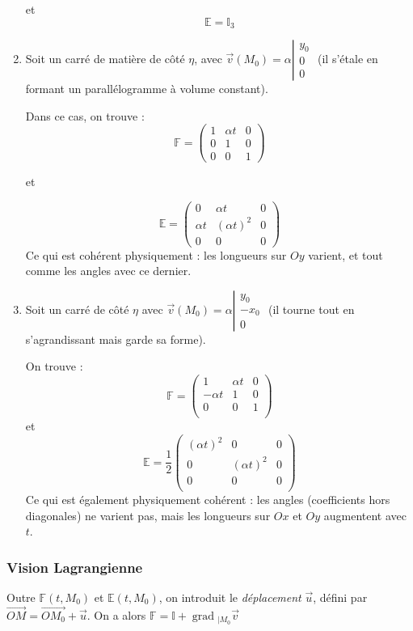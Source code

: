 \documentclass{article}
\newcommand{\grad}{\;\mathrm{grad}\;}
\begin{document}
\begin{enumerate}
et
\[\mathbb{E} = \mathbb{I}_3\]


\item
Soit un carré de matière de côté $\eta$, avec $\vec{v}(M_0)=\alpha \left\lvert \begin{matrix}
y_0\\0\\0
\end{matrix}\right. $ (il s'étale en formant un parallélogramme à volume constant).

Dans ce cas, on trouve : 
\[\mathbb{F} = \begin{pmatrix}
1 & \alpha t & 0\\
0 & 1 & 0\\
0 & 0 & 1
\end{pmatrix}
\]

et

\[\mathbb{E}= \begin{pmatrix}
0 & \alpha t & 0\\
\alpha t & (\alpha t)^2 & 0\\
0 & 0 & 0
\end{pmatrix}
\]
Ce qui est cohérent physiquement : les longueurs sur $Oy$ varient, et tout comme les angles avec ce dernier.

\item Soit un carré de côté $\eta$ avec $\vec{v}(M_0)=\alpha \left\lvert \begin{matrix}
y_0\\-x_0\\0
\end{matrix}\right.$ (il tourne tout en s'agrandissant mais garde sa forme).


On trouve :
\[\mathbb{F} = \begin{pmatrix}
1 & \alpha t & 0\\
-\alpha t & 1 & 0\\
0 & 0 & 1\\
\end{pmatrix}
\]
et
\[
\mathbb{E} = \dfrac{1}{2}\begin{pmatrix}
(\alpha t)^2 & 0 & 0\\
0 & (\alpha t)^2 & 0\\
0 & 0 & 0\\
\end{pmatrix}
\]
Ce qui est également physiquement cohérent : les angles (coefficients hors diagonales) ne varient pas, mais les longueurs sur $Ox$ et $Oy$ augmentent avec $t$.
\end{enumerate}

\subsubsection{Vision Lagrangienne}
Outre $\mathbb{F}(t,M_0)$ et $\mathbb{E}(t, M_0)$, on introduit le \emph{déplacement} $\vec{u}$, défini par $\overrightarrow{OM}=\overrightarrow{OM_0}+\vec{u}$. On a alors $\mathbb{F}= \mathbb{I} + \grad_{| M_0} \vec{v}$
\end{document}
